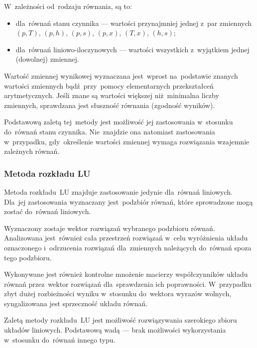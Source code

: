 W~zależności od~rodzaju równania, są to:

\begin{itemize}

	\item dla~równań stanu czynnika --- wartości przynajmniej jednej
		z~par zmiennych $(p, T)$, $(p, h)$, $(p, s)$, $(p, x)$,
		$(T, x)$, $(h, s)$;

	\item dla~równań liniowo-iloczynowych --- wartości wszystkich
		z~wyjątkiem jednej (dowolnej) zmiennej.

\end{itemize}

Wartość zmiennej wynikowej wyznaczana jest~wprost na~podstawie znanych
wartości zmiennych bądź~przy~pomocy elementarnych przekształceń
arytmetycznych. Jeśli znane są wartości większej niż~minimalna liczby
zmiennych, sprawdzana jest słuszność równania (zgodność wyników).

Podstawową zaletą tej~metody jest możliwość jej zastosowania w~stosunku
do~równań stanu czynnika. Nie~znajdzie ona natomiast zastosowania
w~przypadku, gdy~określenie wartości zmiennej wymaga rozwiązania
wzajemnie zależnych równań.


\subsubsection{Metoda rozkładu LU}

Metoda rozkładu~LU znajduje zastosowanie jedynie dla~równań liniowych.
Dla~jej zastosowania wyznaczany jest~podzbiór równań, które sprowadzone
mogą zostać do~równań liniowych.

Wyznaczony zostaje wektor rozwiązań wybranego podzbioru równań.
Analizowana jest~również cała przestrzeń rozwiązań w~celu wyróżnienia
układu oznaczonego i~odrzucenia rozwiązań dla~zmiennych należących
do~równań spoza tego podzbioru.

Wykonywane jest również kontrolne mnożenie macierzy współczynników
układu równań przez~wektor rozwiązań dla~sprawdzenia ich poprawności.
W~przypadku zbyt dużej rozbieżności wyniku w~stosunku do~wektora wyrazów
wolnych, syngalizowana jest sprzeczność układu równań.

Zaletą metody rozkładu~LU jest możliwość rozwiązywania szerokiego zbioru
układów liniowych. Podstawową wadą --- brak możliwości wykorzystania
w~stosunku do~równań innego typu.
